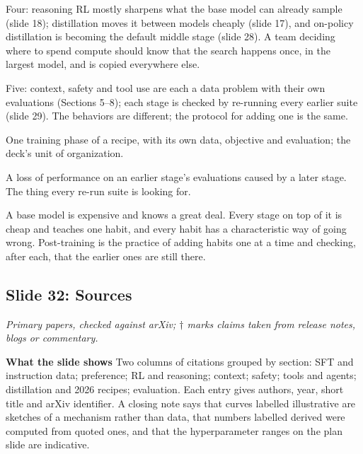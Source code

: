 \documentclass[11pt,letterpaper]{article}
\newcommand{\slide}[3]{%
  \subsection[Slide #1: #2]{Slide #1: #2}%
  {\color{muted}\itshape #3\par}\medskip}
\newcommand{\para}[1]{\medskip\noindent\textbf{#1}\quad}
\newenvironment{terms}{\begin{tcolorbox}[termsbox]\begin{description}[leftmargin=1.1em,itemsep=3pt,topsep=2pt,font=\normalfont]}{\end{description}\end{tcolorbox}}
\newcommand{\term}[2]{\item[\textbf{#1}]\index{#1} #2}
\newenvironment{intuition}{\begin{tcolorbox}[intuitionbox]}{\end{tcolorbox}}
\begin{document}
Four: reasoning RL mostly sharpens what the base model can already sample (slide 18); distillation moves it between models cheaply (slide 17), and on-policy distillation is becoming the default middle stage (slide 28). A team deciding where to spend compute should know that the search happens once, in the largest model, and is copied everywhere else.

Five: context, safety and tool use are each a data problem with their own evaluations (Sections 5--8); each stage is checked by re-running every earlier suite (slide 29). The behaviors are different; the protocol for adding one is the same.

\begin{terms}
\term{stage}{One training phase of a recipe, with its own data, objective and evaluation; the deck's unit of organization.}
\term{regression}{A loss of performance on an earlier stage's evaluations caused by a later stage. The thing every re-run suite is looking for.}
\end{terms}

\begin{intuition}
A base model is expensive and knows a great deal. Every stage on top of it is cheap and teaches one habit, and every habit has a characteristic way of going wrong. Post-training is the practice of adding habits one at a time and checking, after each, that the earlier ones are still there.
\end{intuition}

\slide{32}{Sources}{Primary papers, checked against arXiv; $\dagger$ marks claims taken from release notes, blogs or commentary.}

\para{What the slide shows} Two columns of citations grouped by section: SFT and instruction data; preference; RL and reasoning; context; safety; tools and agents; distillation and 2026 recipes; evaluation. Each entry gives authors, year, short title and arXiv identifier. A closing note says that curves labelled illustrative are sketches of a mechanism rather than data, that numbers labelled derived were computed from quoted ones, and that the hyperparameter ranges on the plan slide are indicative.
\end{document}
